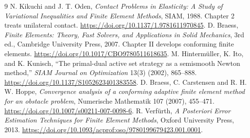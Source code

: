 \documentclass[11pt,a4paper]{article}
\begin{document}
\begin{thebibliography}{9}
 N. Kikuchi and J. T. Oden, \emph{Contact Problems in Elasticity:
A Study of Variational Inequalities and Finite Element Methods}, SIAM, 1988.
Chapter 2 treats unilateral contact. \url{https://doi.org/10.1137/1.9781611970845}.
 D. Braess, \emph{Finite Elements: Theory, Fast Solvers, and
Applications in Solid Mechanics}, 3rd ed., Cambridge University Press, 2007.
Chapter II develops conforming finite elements.
\url{https://doi.org/10.1017/CBO9780511618635}.
 M. Hinterm\"uller, K. Ito, and K. Kunisch,
``The primal-dual active set strategy as a semismooth Newton method,''
\emph{SIAM Journal on Optimization} 13(3) (2002), 865--888. \url{https://doi.org/10.1137/S1052623401383558}.
 D. Braess, C. Carstensen and R. H. W. Hoppe,
\emph{Convergence analysis of a conforming adaptive finite element method for an obstacle problem},
Numerische Mathematik 107 (2007), 455--471.
\url{https://doi.org/10.1007/s00211-007-0098-6}.
 R. Verf\"urth, \emph{A Posteriori Error Estimation Techniques for Finite Element Methods}, Oxford University Press, 2013.
\url{https://doi.org/10.1093/acprof:oso/9780199679423.001.0001}.
\end{thebibliography}
\end{document}
